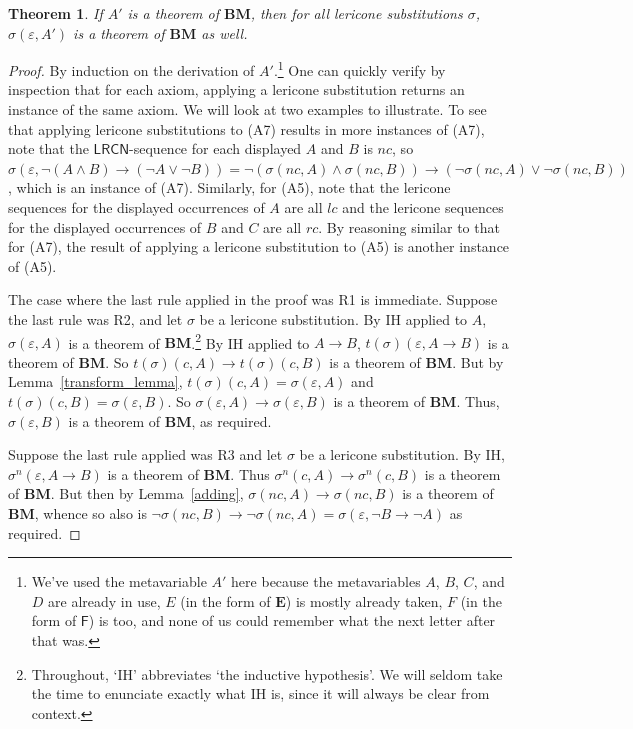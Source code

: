 \documentclass{amsart}
\newtheorem{theorem}{Theorem}
\theoremstyle{definition}
\newcommand{\LRCN}{\mathsf{LRCN}}
\newcommand{\BM}{\mathbf{BM}}
\begin{document}
\begin{theorem}\label{BM_invariance}
    If $A'$ is a theorem of $\BM$, then for all lericone substitutions $\sigma$, $\sigma(\varepsilon,A')$ is a theorem of $\BM$ as well.
\end{theorem}
\begin{proof}
    By induction on the derivation of $A'$.\footnote{We've used the metavariable $A'$ here because the metavariables $A$, $B$, $C$, and $D$ are already in use, $E$ (in the form of $\mathbf{E}$) is mostly already taken, $F$ (in the form of $\mathsf{F}$) is too, and none of us could remember what the next letter after that was.} One can quickly verify by inspection that for each axiom, applying a lericone substitution returns an instance of the same axiom. We will look at two examples to illustrate. To see that applying lericone substitutions to (A7) results in more instances of (A7), note that the $\LRCN$-sequence for each displayed $A$ and $B$ is $nc$, so $\sigma(\varepsilon, \neg(A\land B)\to(\neg A\lor\neg B))=\neg(\sigma(nc, A)\land \sigma(nc, B))\to(\neg\sigma(nc, A)\lor\neg\sigma(nc, B))$, which is an instance of (A7). Similarly, for (A5), note that the lericone sequences for the displayed occurrences of $A$ are all $lc$ and the lericone sequences for the displayed occurrences of $B$ and $C$ are all $rc$. By reasoning similar to that for (A7), the result of applying a lericone substitution to (A5) is another instance of (A5).

    The case where the last rule applied in the proof was R1 is immediate. Suppose the last rule was R2, and let $\sigma$ be a lericone substitution. By IH applied to $A$, $\sigma(\varepsilon,A)$ is a theorem of $\BM$.\footnote{Throughout, `IH' abbreviates `the inductive hypothesis'. We will seldom take the time to enunciate exactly what IH is, since it will always be clear from context.} By IH applied to $A\to B$, $t(\sigma)(\varepsilon,A\to B)$ is a theorem of $\BM$. So $t(\sigma)(c,A)\to t(\sigma)(c,B)$ is a theorem of $\BM$. But by Lemma~\ref{transform_lemma}, $t(\sigma)(c,A)=\sigma(\varepsilon,A)$ and $t(\sigma)(c,B)=\sigma(\varepsilon,B)$. So $\sigma(\varepsilon,A)\to\sigma(\varepsilon,B)$ is a theorem of $\BM$. Thus, $\sigma(\varepsilon,B)$ is a theorem of $\BM$, as required. 

    Suppose the last rule applied was R3 and let $\sigma$ be a lericone substitution. By IH, $\sigma^n(\varepsilon,A\to B)$ is a theorem of $\BM$. Thus $\sigma^n(c,A)\to\sigma^n(c,B)$ is a theorem of $\BM$. But then by Lemma~\ref{adding}, $\sigma(nc,A)\to\sigma(nc,B)$ is a theorem of $\BM$, whence so also is $\neg\sigma(nc,B)\to\neg\sigma(nc,A)=\sigma(\varepsilon,\neg B\to\neg A)$ as required. 


\end{proof}
\end{document}
